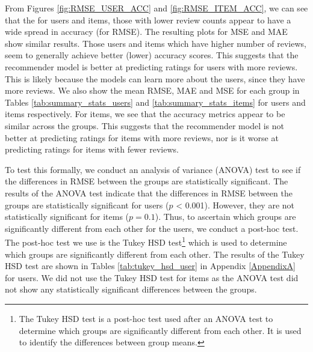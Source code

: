 From Figures \ref{fig:RMSE_USER_ACC} and \ref{fig:RMSE_ITEM_ACC}, we can see that the for users and items, those with lower review counts appear to have a wide spread in accuracy (for RMSE). The resulting plots for MSE and MAE show similar results. Those users and items which have higher number of reviews, seem to generally achieve better (lower) accuracy scores. This suggests that the recommender model is better at predicting ratings for users with more reviews. This is likely because the models can learn more about the users, since they have more reviews. We also show the mean RMSE, MAE and MSE for each group in Tables \ref{tab:summary_stats_users} and \ref{tab:summary_stats_items} for users and items respectively. For items, we see that the accuracy metrics appear to be similar across the groups. This suggests that the recommender model is not better at predicting ratings for items with more reviews, nor is it worse at predicting ratings for items with fewer reviews.

To test this formally, we conduct an analysis of variance (ANOVA) test to see if the differences in RMSE between the groups are statistically significant. The results of the ANOVA test indicate that the differences in RMSE between the groups are statistically significant for users ($p$ < 0.001). However, they are not statistically significant for items ($p = 0.1$). Thus, to ascertain which groups are significantly different from each other for the users, we conduct a post-hoc test. The post-hoc test we use is the Tukey HSD test\footnote{The Tukey HSD test is a post-hoc test used after an ANOVA test to determine which groups are significantly different from each other. It is used to identify the differences between group means.} which is used to determine which groups are significantly different from each other. The results of the Tukey HSD test are shown in Tables \ref{tab:tukey_hsd_user} in Appendix \ref{AppendixA} for users. We did not use the Tukey HSD test for items as the ANOVA test did not show any statistically significant differences between the groups. 

